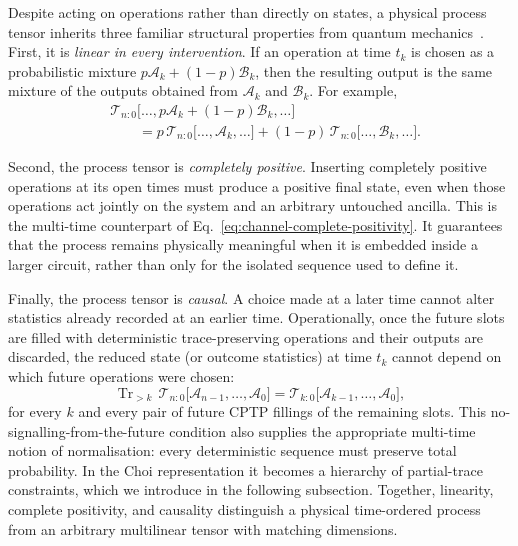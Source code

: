 Despite acting on operations rather than directly on states, a physical process tensor inherits three familiar structural properties from quantum mechanics~\cite{Pollock2018Framework,Milz2021,Taranto2025}.
First, it is \emph{linear in every intervention}.
If an operation at time \(t_k\) is chosen as a probabilistic mixture \(p\mathcal A_k+(1-p)\mathcal B_k\), then the resulting output is the same mixture of the outputs obtained from \(\mathcal A_k\) and \(\mathcal B_k\).
For example,
%
\begin{align}
    &\mathcal T_{n:0} \bigl[ \ldots, p\mathcal A_k+(1-p)\mathcal B_k, \ldots \bigr] \nonumber\\
    &\qquad= p\, \mathcal T_{n:0} \bigl[\ldots,\mathcal A_k,\ldots\bigr]
    +(1-p)\, \mathcal T_{n:0} \bigl[\ldots,\mathcal B_k,\ldots\bigr].
    \label{eq:process-tensor-linearity}
\end{align}
%

Second, the process tensor is \emph{completely positive}.
Inserting completely positive operations at its open times must produce a positive final state, even when those operations act jointly on the system and an arbitrary untouched ancilla.
This is the multi-time counterpart of Eq.~\eqref{eq:channel-complete-positivity}.
It guarantees that the process remains physically meaningful when it is embedded inside a larger circuit, rather than only for the isolated sequence used to define it.

Finally, the process tensor is \emph{causal}.
A choice made at a later time cannot alter statistics already recorded at an earlier time.
Operationally, once the future slots are filled with deterministic trace-preserving operations and their outputs are discarded, the reduced state (or outcome statistics) at time \(t_k\) cannot depend on which future operations were chosen:
%
\begin{equation}
    \operatorname{Tr}_{>k}\, \mathcal T_{n:0} \bigl[\mathcal A_{n-1},\ldots,\mathcal A_0\bigr]
    = \mathcal T_{k:0} \bigl[\mathcal A_{k-1},\ldots,\mathcal A_0\bigr],
    \label{eq:process-tensor-causality}
\end{equation}
%
for every \(k\) and every pair of future CPTP fillings of the remaining slots.
This no-signalling-from-the-future condition also supplies the appropriate multi-time notion of normalisation: every deterministic sequence must preserve total probability.
In the Choi representation it becomes a hierarchy of partial-trace constraints, which we introduce in the following subsection.
Together, linearity, complete positivity, and causality distinguish a physical time-ordered process from an arbitrary multilinear tensor with matching dimensions.

